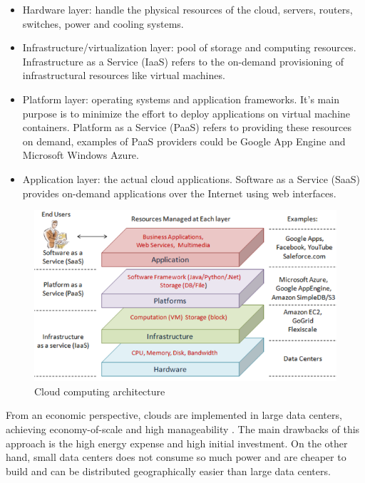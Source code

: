 \documentclass[11pt,english]{article} %
\begin{document}
\begin{itemize}
    \item Hardware layer: handle the physical resources of the cloud, servers, routers, switches, power and cooling systems.
    \item Infrastructure/virtualization layer: pool of storage and computing resources. Infrastructure as a Service (IaaS) refers to the on-demand provisioning of infrastructural resources like virtual machines.
    \item Platform layer: operating systems and application frameworks. It's main purpose is to minimize the effort to deploy applications on virtual machine containers. Platform as a Service (PaaS) refers to providing these resources on demand, examples of PaaS providers could be Google App Engine and Microsoft Windows Azure.
    \item Application layer: the actual cloud applications. Software as a Service (SaaS) provides on-demand applications over the Internet using web interfaces.
\end{itemize}

\begin{figure}[H]
  \centering
  \includegraphics[scale=0.5]{img/cloud-computing-architecture.png}
  \caption{Cloud computing architecture \cite{cloud-computing-state-of-the-art}}
  \label{fig:cloud-computing-architecture}
\end{figure}

From an economic perspective, clouds are implemented in large data centers, achieving economy-of-scale and high manageability \cite{cloud-computing-state-of-the-art}.
The main drawbacks of this approach is the high energy expense and high initial investment.
On the other hand, small data centers does not consume so much power and are cheaper to build and can be distributed geographically easier than large data centers.
\end{document}
